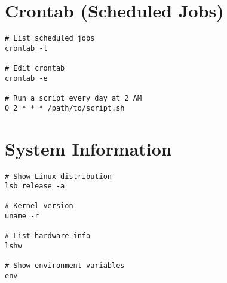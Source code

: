 \documentclass[11pt]{article}
\begin{document}
    \section*{Crontab (Scheduled Jobs)}
    \begin{lstlisting}[style=linuxStyle]
# List scheduled jobs
crontab -l

# Edit crontab
crontab -e

# Run a script every day at 2 AM
0 2 * * * /path/to/script.sh
    \end{lstlisting}

    \section*{System Information}
    \begin{lstlisting}[style=linuxStyle]
# Show Linux distribution
lsb_release -a

# Kernel version
uname -r

# List hardware info
lshw

# Show environment variables
env
    \end{lstlisting}
\end{document}

